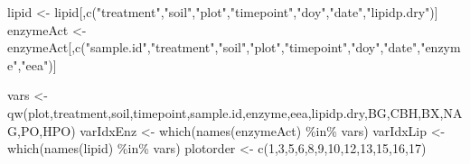 \documentclass[
]{article}
\newenvironment{Shaded}{\begin{snugshade}}{\end{snugshade}}
\newcommand{\DecValTok}[1]{\textcolor[rgb]{0.00,0.00,0.81}{#1}}
\newcommand{\FunctionTok}[1]{\textcolor[rgb]{0.00,0.00,0.00}{#1}}
\newcommand{\NormalTok}[1]{#1}
\newcommand{\OtherTok}[1]{\textcolor[rgb]{0.56,0.35,0.01}{#1}}
\newcommand{\SpecialCharTok}[1]{\textcolor[rgb]{0.00,0.00,0.00}{#1}}
\newcommand{\StringTok}[1]{\textcolor[rgb]{0.31,0.60,0.02}{#1}}
\begin{document}
\begin{Shaded}
\end{Shaded}

\begin{Shaded}
\begin{Highlighting}[]
\NormalTok{lipid }\OtherTok{\textless{}{-}}\NormalTok{ lipid[,}\FunctionTok{c}\NormalTok{(}\StringTok{"treatment"}\NormalTok{,}\StringTok{"soil"}\NormalTok{,}\StringTok{"plot"}\NormalTok{,}\StringTok{"timepoint"}\NormalTok{,}\StringTok{"doy"}\NormalTok{,}\StringTok{"date"}\NormalTok{,}\StringTok{"lipidp.dry"}\NormalTok{)]}
\NormalTok{enzymeAct }\OtherTok{\textless{}{-}}\NormalTok{ enzymeAct[,}\FunctionTok{c}\NormalTok{(}\StringTok{"sample.id"}\NormalTok{,}\StringTok{"treatment"}\NormalTok{,}\StringTok{"soil"}\NormalTok{,}\StringTok{"plot"}\NormalTok{,}\StringTok{"timepoint"}\NormalTok{,}\StringTok{"doy"}\NormalTok{,}\StringTok{"date"}\NormalTok{,}\StringTok{"enzyme"}\NormalTok{,}\StringTok{"eea"}\NormalTok{)]}
\end{Highlighting}
\end{Shaded}

\begin{Shaded}
\begin{Highlighting}[]
\NormalTok{vars }\OtherTok{\textless{}{-}} \FunctionTok{qw}\NormalTok{(plot,treatment,soil,timepoint,sample.id,enzyme,eea,lipidp.dry,BG,CBH,BX,NAG,PO,HPO)}
\NormalTok{varIdxEnz }\OtherTok{\textless{}{-}} \FunctionTok{which}\NormalTok{(}\FunctionTok{names}\NormalTok{(enzymeAct) }\SpecialCharTok{\%in\%}\NormalTok{ vars)}
\NormalTok{varIdxLip }\OtherTok{\textless{}{-}} \FunctionTok{which}\NormalTok{(}\FunctionTok{names}\NormalTok{(lipid) }\SpecialCharTok{\%in\%}\NormalTok{ vars)}
\NormalTok{plotorder }\OtherTok{\textless{}{-}} \FunctionTok{c}\NormalTok{(}\DecValTok{1}\NormalTok{,}\DecValTok{3}\NormalTok{,}\DecValTok{5}\NormalTok{,}\DecValTok{6}\NormalTok{,}\DecValTok{8}\NormalTok{,}\DecValTok{9}\NormalTok{,}\DecValTok{10}\NormalTok{,}\DecValTok{12}\NormalTok{,}\DecValTok{13}\NormalTok{,}\DecValTok{15}\NormalTok{,}\DecValTok{16}\NormalTok{,}\DecValTok{17}\NormalTok{)}
\end{Highlighting}
\end{Shaded}
\end{document}
